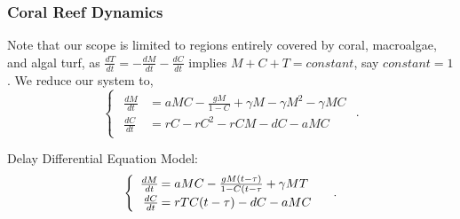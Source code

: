 \begin{frame}\frametitle{Coral Reef Dynamics}
\hspace{1.57em}Note that our scope is limited to regions entirely covered by coral, macroalgae, and algal turf, as $\frac{dT}{dt}=-\frac{dM}{dt}-\frac{dC}{dt}$ implies $M+C+T=constant$, say $constant = 1$.  We reduce our system to, $$\begin{cases} 
\begin{array}{rl}
\frac{dM}{dt}&= aMC-\frac{gM}{1-C} + \gamma M - \gamma M^2-\gamma M C\\ 
\frac{dC}{dt}&=rC-rC^2-rCM-dC-aMC
\end{array} \end{cases}.$$ 
\end{frame}

\begin{frame} Delay Differential Equation Model:
$$\begin{cases}\begin{array}{rl}
\frac{dM}{dt}\hspace{-.8em}&=aMC - \frac{gM(t-\tau)}{1-C(t-\tau}+\gamma M T\\
\frac{dC}{dt}\hspace{-.8em}&=rTC(t-\tau) - dC - aMC\\
\end{array}\end{cases}.$$

\end{frame}